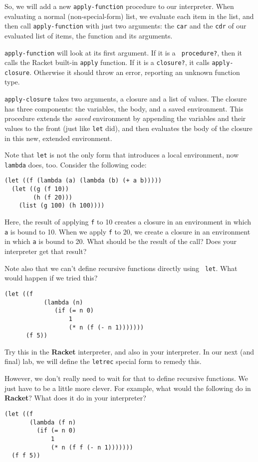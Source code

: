 \documentclass{article}
\begin{document}
So, we will add a new {\tt apply-function} procedure to our
interpreter.  When evaluating a normal (non-special-form) list, we
evaluate each item in the list, and then call {\tt apply-function}
with just two arguments: the {\tt car} and the {\tt cdr} of our
evaluated list of items, the function and its arguments.

{\tt apply-function} will look at its first argument.  If it is a {\tt
  procedure?}, then it calls the Racket built-in {\tt apply}
function.  If it is a {\tt closure?}, it calls {\tt apply-closure}.
Otherwise it should throw an error, reporting an unknown function
type.

{\tt apply-closure} takes two arguments, a closure and a list of
values.  The closure has three components: the variables, the
body, and a saved environment.  This procedure extends the {\em
  saved} environment by appending the variables and their values to
the front (just like {\tt let} did), and then evaluates the body
of the closure in this new, extended environment.

Note that {\tt let} is not the only form that introduces a local
environment, now {\tt lambda} does, too.  Consider the following
code:
\begin{Verbatim}[frame=single]
(let ((f (lambda (a) (lambda (b) (+ a b)))))
  (let ((g (f 10))
        (h (f 20)))
    (list (g 100) (h 100))))  
\end{Verbatim}
Here, the result of applying {\tt f} to 10 creates a closure in an
environment in which {\tt a} is bound to 10.  When we apply {\tt f} to
20, we create a closure in an environment in which {\tt a} is bound to
20.  What should be the result of the call?  Does your interpreter get
that result?

Note also that we can't define recursive functions directly using {\tt
  let}.  What would happen if we tried this?
\begin{Verbatim}[frame=single]
  (let ((f
           (lambda (n)
              (if (= n 0)
                  1
                  (* n (f (- n 1)))))))
      (f 5))
\end{Verbatim}
Try this in the {\bf Racket} interpreter, and also in your
interpreter.
In our next (and final) lab, we will define the {\tt letrec} special
form to remedy this.

However, we don't really need to wait for that to define
recursive functions.  We just have to be a little more clever.
For example, what would the following do in {\bf Racket}?  What does
it do in your interpreter?
\begin{Verbatim}[frame=single]
(let ((f
       (lambda (f n)
         (if (= n 0)
             1
             (* n (f f (- n 1)))))))
  (f f 5))
\end{Verbatim}
\end{document}
